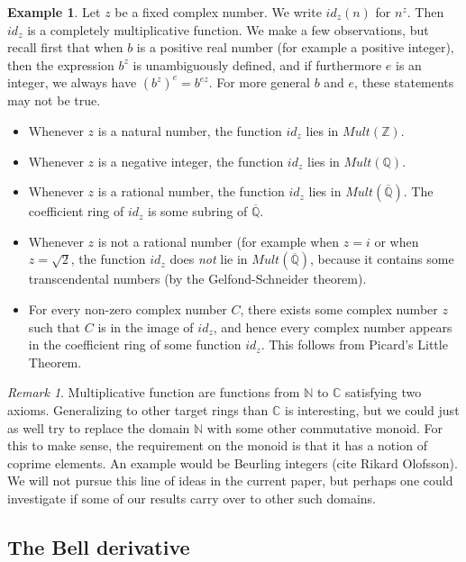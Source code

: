 \documentclass[a4paper]{article}
\theoremstyle{definition}
\newtheorem{example}{Example}[section]
\theoremstyle{remark}
\newtheorem*{remark}{Remark}
\newcommand{\Z}{\mathbb{Z}}
\newcommand{\Q}{\mathbb{Q}}
\newcommand{\C}{\mathbb{C}}
\begin{document}
\begin{example}
Let $z$ be a fixed complex number. We write $id_z(n)$ for $n^z$. Then $id_z$ is a completely multiplicative function. We make a few observations, but recall first that when $b$ is a positive real number (for example a positive integer), then the expression $b^z$ is unambiguously defined, and if furthermore $e$ is an integer, we always have $(b^z)^e = b^{ez}$. For more general $b$ and $e$, these statements may not be true.
\begin{itemize}
\item Whenever $z$ is a natural number, the function $id_z$ lies in $Mult(\Z)$. 
\item Whenever $z$ is a negative integer, the function $id_z$ lies in $Mult(\Q)$.
\item Whenever $z$ is a rational number, the function $id_z$ lies in $Mult(\overline{\Q})$. The coefficient ring of $id_z$ is some subring of $\overline{\Q}$.
\item Whenever $z$ is not a rational number (for example when $z = i$ or when $z = \sqrt{2}$, the function $id_z$ does \emph{not} lie in $Mult(\overline{\Q})$, because it contains some transcendental numbers (by the Gelfond-Schneider theorem).
\item For every non-zero complex number $C$, there exists some complex number $z$ such that $C$ is in the image of $id_z$, and hence every complex number appears in the coefficient ring of some function $id_z$. This follows from Picard's Little Theorem.
\end{itemize}

\end{example}

\begin{remark}
Multiplicative function are functions from $\mathbb{N}$ to $\mathbb{C}$ satisfying two axioms. Generalizing to other target rings than $\C$ is interesting, but we could just as well try to replace the domain $\mathbb{N}$ with some other commutative monoid. For this to make sense, the requirement on the monoid is that it has a notion of coprime elements. An example would be Beurling integers (cite Rikard Olofsson). We will not pursue this line of ideas in the current paper, but perhaps one could investigate if some of our results carry over to other such domains.
\end{remark}


\subsection{The Bell derivative}
\end{document}

